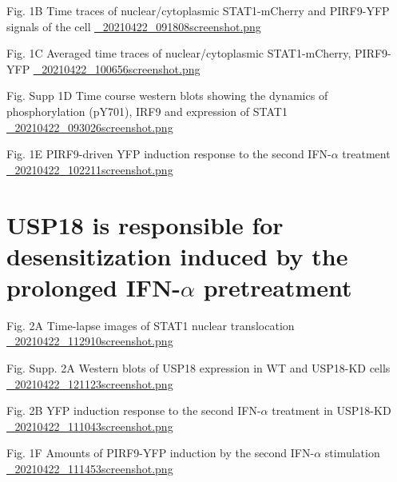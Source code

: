 \documentclass[bigger]{beamer}
\begin{document}
\begin{frame}[label={sec:orgdec43c3}]{Fig. 1B Time traces of nuclear/cytoplasmic STAT1-mCherry and PIRF9-YFP signals of the cell}
\url{\_20210422\_091808screenshot.png}
\end{frame}

\begin{frame}[label={sec:org09960b9}]{Fig. 1C Averaged time traces of nuclear/cytoplasmic STAT1-mCherry, PIRF9-YFP}
\url{\_20210422\_100656screenshot.png}
\end{frame}


\begin{frame}[label={sec:org258833f}]{Fig. Supp 1D Time course western blots showing the dynamics of phosphorylation (pY701), IRF9 and expression of STAT1}
\url{\_20210422\_093026screenshot.png}
\end{frame}

\begin{frame}[label={sec:orgd22d88c}]{Fig. 1E PIRF9-driven YFP induction response to the second IFN-\(\alpha\) treatment}
\url{\_20210422\_102211screenshot.png}
\end{frame}



\section{USP18 is responsible for desensitization induced by the prolonged IFN-\(\alpha\) pretreatment}
\label{sec:orgfad5425}

\begin{frame}[label={sec:orgb79726b}]{Fig. 2A Time-lapse images of STAT1 nuclear translocation}
\url{\_20210422\_112910screenshot.png}
\end{frame}

\begin{frame}[label={sec:org50accf8}]{Fig. Supp. 2A Western blots of USP18 expression in WT and USP18-KD cells}
\url{\_20210422\_121123screenshot.png}
\end{frame}

\begin{frame}[label={sec:org715779a}]{Fig. 2B YFP induction response to the second IFN-\(\alpha\) treatment in USP18-KD}
\url{\_20210422\_111043screenshot.png}
\end{frame}

\begin{frame}[label={sec:org985da8a}]{Fig. 1F Amounts of PIRF9-YFP induction by the second IFN-\(\alpha\) stimulation}
\url{\_20210422\_111453screenshot.png}
\end{frame}
\end{document}
